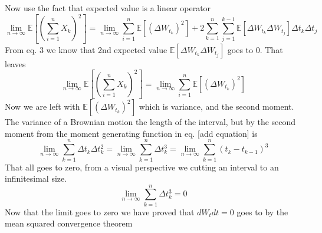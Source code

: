 \documentclass{article}
\begin{document}
Now use the fact that expected value is a linear operator
$$
\lim_{n \to \infty} \mathbb{E} \left[ \left( \sum_{i=1}^n X_k \right)^2 \right] = \lim_{n \to \infty} \sum_{i=1}^n \mathbb{E} \left[(\Delta W_{t_k})^2 \right] + 2 \sum_{k=1}^n \sum_{j=1}^{k-1} \mathbb{E} \left[ \Delta W_{t_k} \Delta W_{t_j} \right] \Delta t_k \Delta t_j
$$
From eq. 3 we know that 2nd expected value $\mathbb{E} \left[ \Delta W_{t_k} \Delta W_{t_j} \right]$ goes to 0. That leaves
$$
\lim_{n \to \infty} \mathbb{E} \left[ \left( \sum_{i=1}^n X_k \right)^2 \right] = \lim_{n \to \infty} \sum_{i=1}^n \mathbb{E} \left[(\Delta W_{t_k})^2 \right] 
$$
Now we are left with $\mathbb{E} \left[ (\Delta W_{t_k})^2 \right]$ which is variance, and the second moment. The variance of a Brownian motion the length of the interval, but by the second moment from the moment generating function in eq. [add equation] is 
$$
\lim_{n \to \infty} \sum_{k=1}^n \Delta t_k \Delta t_k^2 = \lim_{n \to \infty} \sum_{k=1}^n \Delta t_k^3 = \lim_{n \to \infty} \sum_{k=1}^n (t_k - t_{k-1})^3
$$
That all goes to zero, from a visual perspective we cutting an interval to an infinitesimal size.
$$
\lim_{n \to \infty} \sum_{k=1}^n \Delta t_k^3 = 0
$$
Now that the limit goes to zero we have proved that $dW_t dt = 0$ goes to by the mean squared convergence theorem
\end{document}
